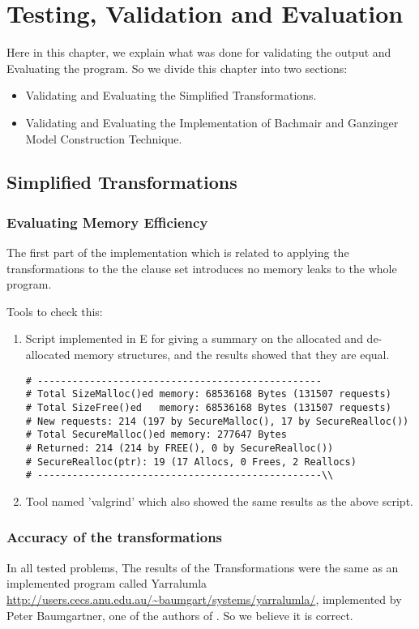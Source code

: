 \chapter{Testing, Validation and Evaluation}\label{chap:test_and_val}
Here in this chapter, we explain what was done for validating the output and Evaluating the program. So we divide this chapter into two sections:
\begin{itemize}
	\item Validating and Evaluating the Simplified Transformations.
	\item Validating and Evaluating the Implementation of Bachmair and Ganzinger Model Construction Technique.
\end{itemize} 

\section{Simplified Transformations}

\subsection{Evaluating Memory Efficiency}\label{sub:val_tran_mem}
The first part of the implementation which is related to applying the transformations to the the clause set introduces no memory leaks to the whole program.


Tools to check this:
\begin{enumerate}
	\item Script implemented in E for giving a summary on the allocated and de-allocated memory structures, and the results showed that they are equal.
		\begin{lstlisting}
# -------------------------------------------------
# Total SizeMalloc()ed memory: 68536168 Bytes (131507 requests)
# Total SizeFree()ed   memory: 68536168 Bytes (131507 requests)
# New requests: 214 (197 by SecureMalloc(), 17 by SecureRealloc())
# Total SecureMalloc()ed memory: 277647 Bytes
# Returned: 214 (214 by FREE(), 0 by SecureRealloc())
# SecureRealloc(ptr): 19 (17 Allocs, 0 Frees, 2 Reallocs)
# -------------------------------------------------\\
		\end{lstlisting}
	\item Tool named 'valgrind' which also showed the same results as the above script.
\end{enumerate}


\subsection{Accuracy of the transformations}
In all tested problems, The results of the Transformations were the same as an implemented program called Yarralumla \url{http://users.cecs.anu.edu.au/~baumgart/systems/yarralumla/}, implemented by Peter Baumgartner, one of the authors of \cite{BMUG06}. So we believe it is correct.


